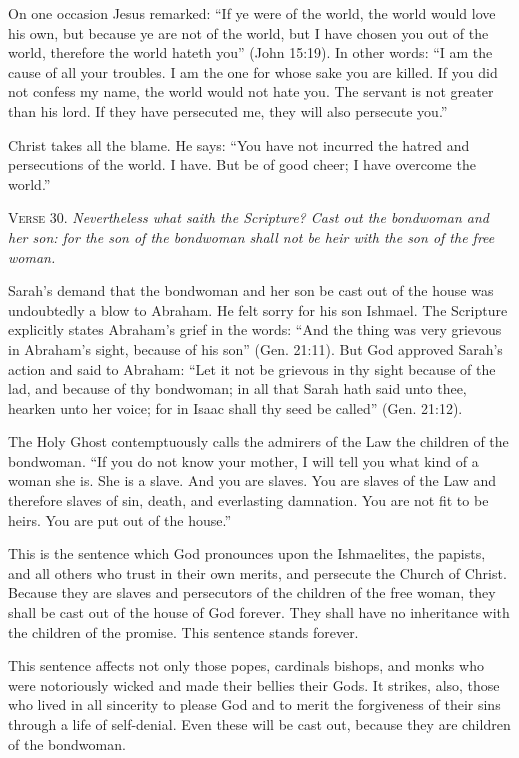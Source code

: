 On one occasion Jesus remarked: “If ye were of the world, the world would love his own, but because ye are not of the world, but I have chosen you out of the world, therefore the world hateth you” (John 15:19). In other words: “I am the cause of all your troubles. I am the one for whose sake you are killed. If you did not confess my name, the world would not hate you. The servant is not greater than his lord. If they have persecuted me, they will also persecute you.”

Christ takes all the blame. He says: “You have not incurred the hatred and persecutions of the world. I have. But be of good cheer; I have overcome the world.”

\textsc{Verse} 30. \emph{Nevertheless what saith the Scripture? Cast out the bondwoman and her son: for the son of the bondwoman shall not be heir with the son of the free woman.}

Sarah’s demand that the bondwoman and her son be cast out of the house was undoubtedly a blow to Abraham. He felt sorry for his son Ishmael. The Scripture explicitly states Abraham’s grief in the words: “And the thing was very grievous in Abraham’s sight, because of his son” (Gen. 21:11). But God approved Sarah’s action and said to Abraham: “Let it not be grievous in thy sight because of the lad, and because of thy bondwoman; in all that Sarah hath said unto thee, hearken unto her voice; for in Isaac shall thy seed be called” (Gen. 21:12).

The Holy Ghost contemptuously calls the admirers of the Law the children of the bondwoman. “If you do not know your mother, I will tell you what kind of a woman she is. She is a slave. And you are slaves. You are slaves of the Law and therefore slaves of sin, death, and everlasting damnation. You are not fit to be heirs. You are put out of the house.”

This is the sentence which God pronounces upon the Ishmaelites, the papists, and all others who trust in their own merits, and persecute the Church of Christ. Because they are slaves and persecutors of the children of the free woman, they shall be cast out of the house of God forever. They shall have no inheritance with the children of the promise. This sentence stands forever.

This sentence affects not only those popes, cardinals bishops, and monks who were notoriously wicked and made their bellies their Gods. It strikes, also, those who lived in all sincerity to please God and to merit the forgiveness of their sins through a life of self-denial. Even these will be cast out, because they are children of the bondwoman.

